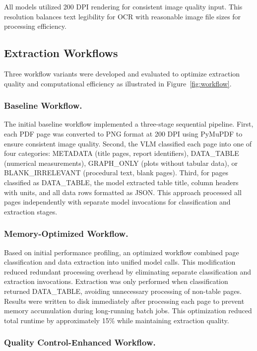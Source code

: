 \documentclass{svproc}
\begin{document}
All models utilized 200 DPI rendering for consistent image quality input. This resolution balances text legibility for OCR with reasonable image file sizes for processing efficiency.

\subsection{Extraction Workflows}

Three workflow variants were developed and evaluated to optimize extraction quality and computational efficiency as illustrated in Figure~\ref{fig:workflow}.

\subsubsection{Baseline Workflow.}

The initial baseline workflow implemented a three-stage sequential pipeline. First, each PDF page was converted to PNG format at 200 DPI using PyMuPDF to ensure consistent image quality. Second, the VLM classified each page into one of four categories: METADATA (title pages, report identifiers), DATA\_TABLE (numerical measurements), GRAPH\_ONLY (plots without tabular data), or BLANK\_IRRELEVANT (procedural text, blank pages). Third, for pages classified as DATA\_TABLE, the model extracted table title, column headers with units, and all data rows formatted as JSON. This approach processed all pages independently with separate model invocations for classification and extraction stages.

\subsubsection{Memory-Optimized Workflow.}

Based on initial performance profiling, an optimized workflow combined page classification and data extraction into unified model calls. This modification reduced redundant processing overhead by eliminating separate classification and extraction invocations. Extraction was only performed when classification returned DATA\_TABLE, avoiding unnecessary processing of non-table pages. Results were written to disk immediately after processing each page to prevent memory accumulation during long-running batch jobs. This optimization reduced total runtime by approximately 15\% while maintaining extraction quality.

\subsubsection{Quality Control-Enhanced Workflow.}
\end{document}
